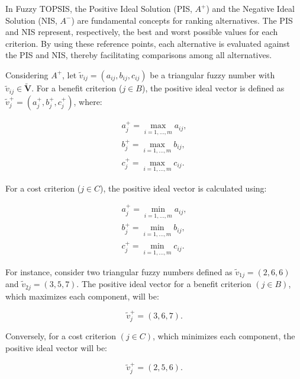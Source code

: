 \documentclass[iicol]{sn-jnl}
\begin{document}
In Fuzzy TOPSIS, the Positive Ideal Solution (PIS, $A^+$) and the Negative Ideal Solution (NIS, $A^-$) are fundamental concepts for ranking alternatives. The PIS and NIS represent, respectively, the best and worst possible values for each criterion. By using these reference points, each alternative is evaluated against the PIS and NIS, thereby facilitating comparisons among all alternatives.

Considering $A^+$, let $\tilde{v}_{ij} = (a_{ij}, b_{ij}, c_{ij})$ be a triangular fuzzy number with $\tilde{v}_{ij} \in \mathbf{\tilde{V}}$. For a benefit criterion ($j \in B$), the positive ideal vector is defined as $\tilde{v}^+_j = (a^+_{j}, b^+_{j}, c^+_{j})$, where:

\begin{equation}
    \begin{split}
    a^+_{j} = \max_{i=1,\dots,m} a_{ij}, \\
    b^+_{j} = \max_{i=1,\dots,m} b_{ij}, \\
    c^+_{j} = \max_{i=1,\dots,m} c_{ij}.
    \end{split}
\end{equation}

For a cost criterion ($j \in C$), the positive ideal vector is calculated using:

\begin{equation}
    \begin{split}
    a^+_{j} = \min_{i=1,\dots,m} a_{ij}, \\
    b^+_{j} = \min_{i=1,\dots,m} b_{ij}, \\
    c^+_{j} = \min_{i=1,\dots,m} c_{ij}.
    \end{split}
\end{equation}

For instance, consider two triangular fuzzy numbers defined as $\tilde{v}_{1j} = (2, 6, 6)$ and $\tilde{v}_{2j} = (3, 5, 7)$. The positive ideal vector for a benefit criterion $(j \in B)$, which maximizes each component, will be:

\begin{equation}
\tilde{v}^+_j = (3, 6, 7).
\end{equation}

Conversely, for a cost criterion $(j \in C)$, which minimizes each component, the positive ideal vector will be:

\begin{equation}
\tilde{v}^+_j = (2, 5, 6).
\end{equation}
\end{document}
